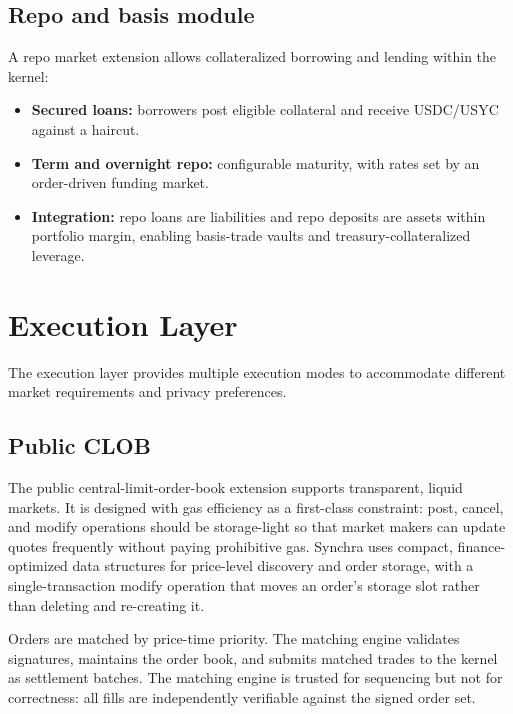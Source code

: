 \documentclass[11pt,a4paper]{article}
\begin{document}
\subsection{Repo and basis module}

A repo market extension allows collateralized borrowing and lending within the kernel:
\begin{itemize}
  \item \textbf{Secured loans:} borrowers post eligible collateral and receive USDC/USYC against a haircut.
  \item \textbf{Term and overnight repo:} configurable maturity, with rates set by an order-driven funding market.
  \item \textbf{Integration:} repo loans are liabilities and repo deposits are assets within portfolio margin, enabling basis-trade vaults and treasury-collateralized leverage.
\end{itemize}

\section{Execution Layer}
\label{sec:execution}

The execution layer provides multiple execution modes to accommodate different market requirements and privacy preferences.

\subsection{Public CLOB}

The public central-limit-order-book extension supports transparent, liquid markets. It is designed with gas efficiency as a first-class constraint: post, cancel, and modify operations should be storage-light so that market makers can update quotes frequently without paying prohibitive gas. Synchra uses compact, finance-optimized data structures for price-level discovery and order storage, with a single-transaction modify operation that moves an order's storage slot rather than deleting and re-creating it.

Orders are matched by price-time priority. The matching engine validates signatures, maintains the order book, and submits matched trades to the kernel as settlement batches. The matching engine is trusted for sequencing but not for correctness: all fills are independently verifiable against the signed order set.
\end{document}
